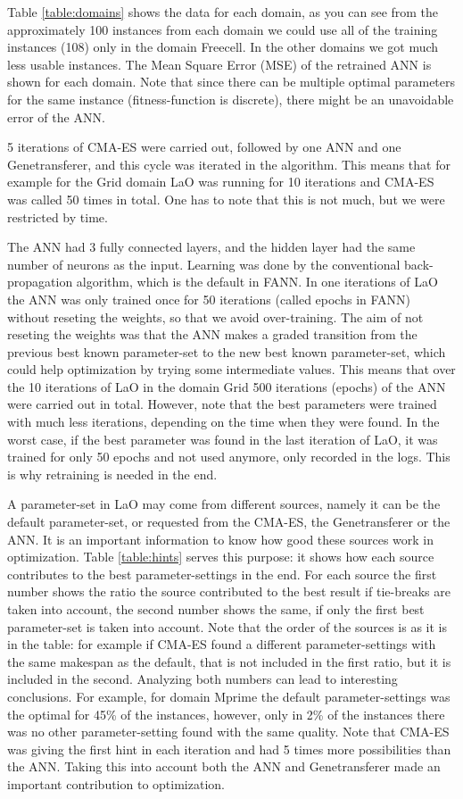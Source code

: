 \documentclass{acm_proc_article-sp}
\begin{document}
Table \ref{table:domains} shows the data for each domain, as you can see from the approximately 100 instances from each domain we could use all of the training instances (108) only in the domain Freecell. In the other domains we got much less usable instances. The Mean Square Error (MSE) of the retrained ANN is shown for each domain. Note that since there can be multiple optimal parameters for the same instance (fitness-function is discrete), there might be an unavoidable error of the ANN.

5 iterations of CMA-ES were carried out, followed by one ANN and one Genetransferer, and this cycle was iterated in the algorithm. This means that for example for the Grid domain LaO was running for 10 iterations and CMA-ES was called 50 times in total. One has to note that this is not much, but we were restricted by time.

The ANN had 3 fully connected layers, and the hidden layer had the same number of neurons as the input. Learning was done by the conventional back-propagation algorithm, which is the default in FANN. In one iterations of LaO the ANN was only trained once for 50 iterations (called epochs in FANN) without reseting the weights, so that we avoid over-training. The aim of not reseting the weights was that the ANN makes a graded transition from the previous best known parameter-set to the new best known parameter-set, which could help optimization by trying some intermediate values. This means that over the 10 iterations of LaO in the domain Grid 500 iterations (epochs) of the ANN were carried out in total. However, note that the best parameters were trained with much less iterations, depending on the time when they were found. In the worst case, if the best parameter was found in the last iteration of LaO, it was trained for only 50 epochs and not used anymore, only recorded in the logs. This is why retraining is needed in the end.

A parameter-set in LaO may come from different sources, namely it can be the default parameter-set, or requested from the CMA-ES, the Genetransferer or the ANN. It is an important information to know how good these sources work in optimization. Table \ref{table:hints} serves this purpose: it shows how each source contributes to the best parameter-settings in the end. For each source the first number shows the ratio the source contributed to the best result if tie-breaks are taken into account, the second number shows the same, if only the first best parameter-set is taken into account. Note that the order of the sources is as it is in the table: for example if CMA-ES found a different parameter-settings with the same makespan as the default, that is not included in the first ratio, but it is included in the second. Analyzing both numbers can lead to interesting conclusions. For example, for domain Mprime the default parameter-settings was the optimal for 45\% of the instances, however, only in 2\% of the instances there was no other parameter-setting found with the same quality. Note that CMA-ES was giving the first hint in each iteration and had 5 times more possibilities than the ANN. Taking this into account both the ANN and Genetransferer made an important contribution to optimization.
\end{document}
